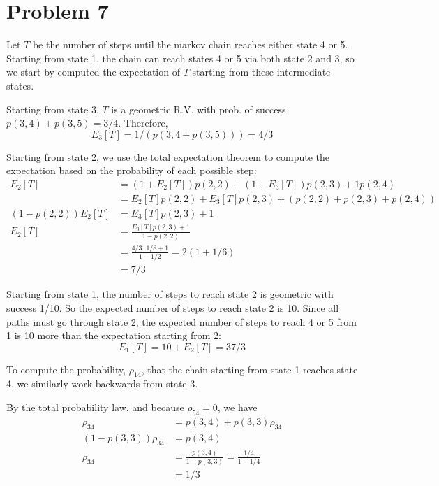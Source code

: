 \documentclass{homework}
\begin{document}
\section{Problem 7}
\begin{letterenum}
\item Let $T$ be the number of steps until the markov chain reaches
either state 4 or 5. Starting from state 1, the chain can reach
states 4 or 5 via both state 2 and 3, so we start by computed the expectation
of $T$ starting from these intermediate states.

Starting from state 3, $T$ is a geometric R.V. with prob. of success
$p(3,4) + p(3, 5) = 3/4$. Therefore,
\begin{equation*}
    E_3[T] = 1 / (p(3,4 + p(3,5))) = 4/3
\end{equation*}

Starting from state 2, we use the total expectation theorem to compute
the expectation based on the probability of each possible step:
\begin{align*}
    E_2[T] &= (1 + E_2[T]) p(2, 2) + (1 + E_3[T]) p(2, 3) + 1 p(2,4) \\
        &= E_2[T] p(2, 2) + E_3[T] p(2, 3) + (p(2, 2) + p(2, 3) + p(2, 4)) \\
    (1 - p(2, 2)) E_2[T] &= E_3[T] p(2, 3) + 1 \\
    E_2[T] &= \frac{E_3[T] p(2, 3) + 1}{1 - p(2, 2)} \\
        &= \frac{4/3 \cdot 1/8 + 1}{1 - 1/2} = 2 (1 + 1/6) \\
        &= 7/3
\end{align*}

Starting from state 1, the number of steps to reach state 2 is geometric
with success 1/10. So the expected number of steps to reach state 2 is 10.
Since all paths must go through state 2, the expected number of steps 
to reach 4 or 5 from 1 is 10 more than the expectation starting from 2:
\begin{equation*}
    E_1[T] = 10 + E_2[T] = 37/3
\end{equation*}

\item To compute the probability, $\rho_{14}$, that the chain 
starting from state 1 reaches state 4, we similarly work backwards from state 3.

By the total probability law, and because $\rho_{54} = 0$, we have
\begin{align*}
    \rho_{34} &= p(3, 4) + p(3, 3) \rho_{34} \\
    (1 - p(3, 3)) \rho_{34} &= p(3, 4) \\
    \rho_{34} &= \frac{p(3,4)}{1 - p(3, 3)} = \frac{1/4}{1 - 1/4} \\
        &= 1/3 
\end{align*}


\end{letterenum}
\end{document}
